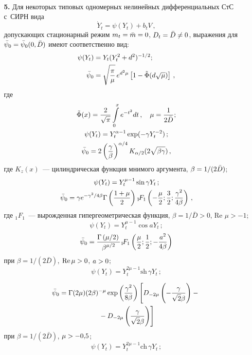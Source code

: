 \begin{multicols}{2}
\textbf{5.}
Для некоторых типовых одномерных нелинейных дифференциальных СтС с~СИРН вида
\begin{equation*}
\dot Y_t =\psi (Y_t) +b_t V\,, %
\end{equation*}
допускающих стационарный режим $m_t \hm= \bar m \hm=0$, $D_t \hm= \bar D \hm\ne 0$,
выражения для  $\bar \psi_0 \hm=\bar\psi_0 (0, \bar D)$ имеют соответственно вид:
    \begin{align}
    \psi (Y_t) &= Y_t (Y_t^2 + d^2)^{-1/2};\notag\\
\bar \psi_0 &= \sqrt{\displaystyle\frac{\displaystyle \pi\mathstrut}{\displaystyle \mu\mathstrut}}\, e^{d^2\mu} \left[ 1-\tilde\Phi (d\sqrt{\mu})\right]\,,
\label{e4.21-sin}
\end{align}
где
\begin{gather}
\tilde\Phi (x) = \displaystyle\frac{\displaystyle 2\mathstrut}{\displaystyle \sqrt{\pi}\mathstrut}
\int\limits\limits_0^x e^{-t^2}dt\,,\quad
\mu =\displaystyle\frac{\displaystyle 1\mathstrut}{\displaystyle 2\bar D\mathstrut};\notag
\\
\psi(Y_t) = Y_t^{\alpha-1} \exp (-\gamma Y_t^{-2})\,;\notag\\
\bar \psi_0 = 2 \left(\displaystyle\frac{\displaystyle \gamma\mathstrut}{\displaystyle \beta\mathstrut}\right)^{\alpha/4} K_{\alpha/2}
(2\sqrt{\beta\gamma})\,,
\label{e4.22-sin}
\end{gather}
где $K_z (x)$~--- цилиндрическая функция мнимого аргумента, $\beta \hm=
1/(2\bar D)$;
\begin{gather}
\psi (Y_t) = Y_t^{\mu-1} \sin\gamma Y_t\,;\notag\\
\bar\psi_0 = \gamma e^{-\gamma^2/4\beta} \Gamma
\left(\displaystyle\frac{\displaystyle 1+\mu\mathstrut}{\displaystyle 2\mathstrut}\right){}_1\! F_1 \left(-\displaystyle\frac{\displaystyle \mu\mathstrut}{\displaystyle 2\mathstrut};\displaystyle\frac{\displaystyle 3\mathstrut}{\displaystyle 2\mathstrut};\displaystyle\frac{\displaystyle \gamma^2\mathstrut}{\displaystyle 4\beta\mathstrut}\right)\,,
\label{e4.23-sin}
\end{gather}
где ${ }_1\! F_1$~--- вырожденная гипергеометрическая функция, $\beta =
{1}/{\bar D} >0$, Re $\mu>-1$;
    $$\psi (Y_t) = Y_t^{\mu-1} \cos a Y_t\,;$$
\begin{equation}
\bar\psi_0 = \displaystyle\frac{\displaystyle \Gamma\left({\mu}/{2}\right)\mathstrut}{\displaystyle \beta^{\mu/2}\mathstrut}{ }_1\! F_1\left(\displaystyle\frac{\displaystyle \mu\mathstrut}{\displaystyle 2\mathstrut};\displaystyle\frac{\displaystyle 1\mathstrut}{\displaystyle 2\mathstrut};-\displaystyle\frac{\displaystyle a^2\mathstrut}{\displaystyle 4\beta\mathstrut}\right)
\label{e4.24-sin}
\end{equation}
при
$\beta ={1}/({2\bar D})$, $\mathrm{Re}\, \mu\hm>0$,
$a\hm>0$;
      $$\psi (Y_t) = Y_t^{2\mu-1} \mathrm{sh}\,\gamma Y_t\,;$$

      \vspace*{-12pt}

      \noindent
\begin{multline}
\bar\psi_0 = \Gamma (2\mu) (2\beta)^{-\mu} \exp \left(
\displaystyle\frac{\displaystyle \gamma^2\mathstrut}{\displaystyle 8\beta\mathstrut}\right) \left[ D_{-2\mu} \left( -\displaystyle\frac{\displaystyle \gamma\mathstrut}{\displaystyle \sqrt{2}\beta\mathstrut}\right) -
{}\right.\\
\left.{}- D_{-2\mu}  \left( \displaystyle\frac{\displaystyle \gamma\mathstrut}{\displaystyle \sqrt{2}\beta\mathstrut}\right) \right]
\label{e4.25-sin}
\end{multline}
при
$\beta ={1}/({2 \bar D})$, $\mu\hm>-0{,}5$;
   $$\psi (Y_t) = Y_t^{2\mu-1} \mathrm{ch}\,\gamma Y_t\,;$$



\end{multicols}
